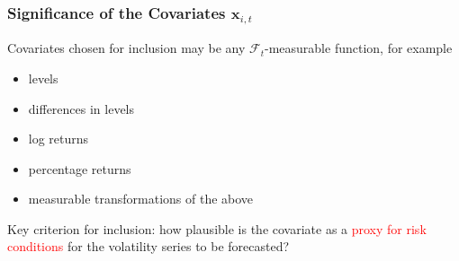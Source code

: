 \documentclass[9pt]{beamer}
\newcommand{\x}{\textbf{x}}
\newcommand{\simiid}{\stackrel{iid}{\sim}} %
\def\E{\mathbb{E}} %
\theoremstyle{definition}
\begin{document}
    \begin{frame}
        \frametitle{Significance of the Covariates $\x_{i,t}$}
        Covariates chosen for inclusion may be any $\mathcal{F}_{t}$-measurable function, for example
        \begin{itemize}
            \item levels
            \item differences in levels
            \item log returns
            \item percentage returns
            \item measurable transformations of the above
        \end{itemize}
    
        \bigbreak 
    
        Key criterion for inclusion: how plausible is the covariate as a \textcolor{red}{proxy for risk conditions} for the volatility series to be forecasted?
    \end{frame}
    
    
    
    
    
    
    
    
    
    
\end{document}
